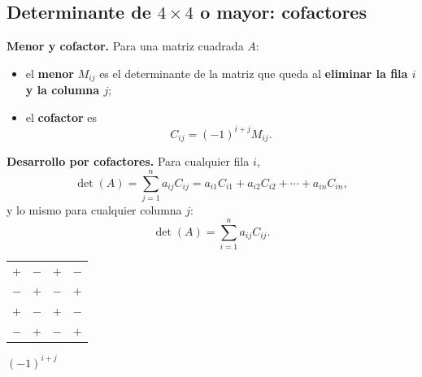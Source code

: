 \documentclass[12pt, letterpaper]{article}
\begin{document}
\subsection{Determinante de $4\times4$ o mayor: cofactores}

\begin{cuadroteoria}
  \small
  \textbf{Menor y cofactor.} Para una matriz cuadrada $A$:
  \begin{itemize}[leftmargin=1.2em, nosep]
    \item el \textbf{menor} $M_{ij}$ es el determinante de la matriz que
          queda al \textbf{eliminar la fila $i$ y la columna $j$};
    \item el \textbf{cofactor} es
          \[
            C_{ij}=(-1)^{i+j}M_{ij}.
          \]
  \end{itemize}
  \textbf{Desarrollo por cofactores.} Para cualquier fila $i$,
  \[
    \det(A)=\sum_{j=1}^{n}a_{ij}C_{ij}
    =a_{i1}C_{i1}+a_{i2}C_{i2}+\cdots+a_{in}C_{in},
  \]
  y lo mismo para cualquier columna $j$:
  \[
    \det(A)=\sum_{i=1}^{n}a_{ij}C_{ij}.
  \]
\end{cuadroteoria}

\begin{center}
\small
\begin{tabular}{@{}cccc@{}}
  \toprule
  $+$ & $-$ & $+$ & $-$ \\
  $-$ & $+$ & $-$ & $+$ \\
  $+$ & $-$ & $+$ & $-$ \\
  $-$ & $+$ & $-$ & $+$ \\
  \bottomrule
\end{tabular}
\qquad
{} $(-1)^{i+j}$
\end{center}
\end{document}
